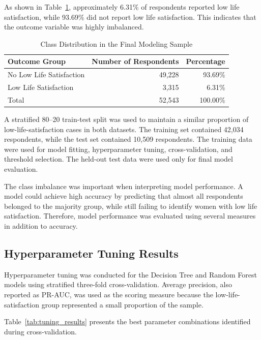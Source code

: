 \documentclass[12pt]{article}
\begin{document}
As shown in Table~\ref{tab:target_distribution}, approximately 6.31\% of respondents reported low life satisfaction, while 93.69\% did not report low life satisfaction. This indicates that the outcome variable was highly imbalanced.

\begin{table}[H]
\centering
\caption{Class Distribution in the Final Modeling Sample}
\label{tab:target_distribution}
\begin{tabular}{lrr}
\hline
\textbf{Outcome Group} &
\textbf{Number of Respondents} &
\textbf{Percentage} \\
\hline
No Low Life Satisfaction & 49,228 & 93.69\% \\
Low Life Satisfaction & 3,315 & 6.31\% \\
\hline
Total & 52,543 & 100.00\% \\
\hline
\end{tabular}
\end{table}

A stratified 80--20 train-test split was used to maintain a similar proportion of low-life-satisfaction cases in both datasets. The training set contained 42,034 respondents, while the test set contained 10,509 respondents. The training data were used for model fitting, hyperparameter tuning, cross-validation, and threshold selection. The held-out test data were used only for final model evaluation.

The class imbalance was important when interpreting model performance. A model could achieve high accuracy by predicting that almost all respondents belonged to the majority group, while still failing to identify women with low life satisfaction. Therefore, model performance was evaluated using several measures in addition to accuracy.

\subsection{Hyperparameter Tuning Results}

Hyperparameter tuning was conducted for the Decision Tree and Random Forest models using stratified three-fold cross-validation. Average precision, also reported as PR-AUC, was used as the scoring measure because the low-life-satisfaction group represented a small proportion of the sample.

Table~\ref{tab:tuning_results} presents the best parameter combinations identified during cross-validation.
\end{document}
